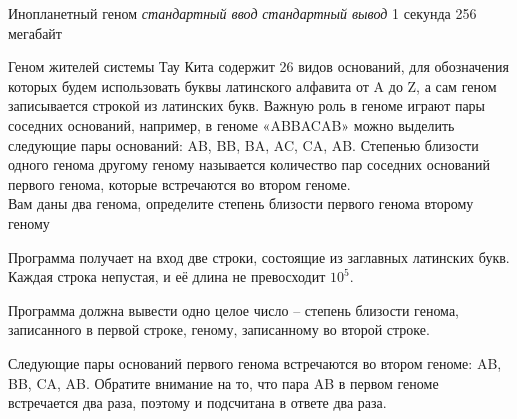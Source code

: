 \begin{problem}%
{Инопланетный геном}%
{\textsl{стандартный ввод}}%
{\textsl{стандартный вывод}}%
{1 секунда}%
{256 мегабайт}{}

Геном жителей системы Тау Кита содержит 26 видов оснований, для обозначения которых будем использовать буквы латинского алфавита от A до Z, а сам геном записывается строкой из латинских букв. Важную роль в геноме играют пары соседних оснований, например, в геноме «ABBACAB» можно выделить следующие пары оснований: AB, BB, BA, AC, CA, AB.
Степенью близости одного генома другому геному называется количество пар соседних оснований первого генома, которые встречаются во втором геноме.\\

Вам даны два генома, определите степень близости первого генома второму геному

\InputFile

Программа получает на вход две строки, состоящие из заглавных латинских букв.
Каждая строка непустая, и её длина не превосходит $10^5$.

\OutputFile

Программа должна вывести одно целое число – степень близости генома, записанного в первой строке, геному, записанному во второй строке.

\Examples

\begin{example}
%
\end{example}

\Explanations

Следующие пары оснований первого генома встречаются
во втором геноме: AB, BB, CA, AB. Обратите внимание на то, что пара AB в первом геноме встречается два раза, поэтому и подсчитана в ответе два раза.

\end{problem}
